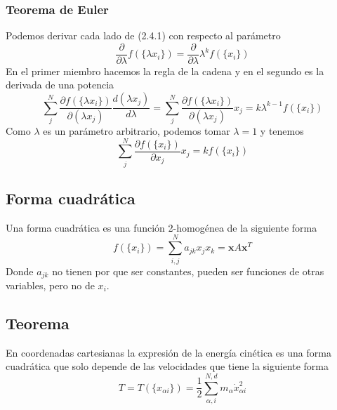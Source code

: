 \subsubsection{Teorema de Euler}
Podemos derivar cada lado de (2.4.1) con respecto al parámetro
\[\frac{\partial}{\partial \lambda} f(\{\lambda x_i\})= \frac{\partial}{\partial \lambda} \lambda^k f(\{x_i\})\]
En el primer miembro hacemos la regla de la cadena y en el segundo es la derivada de una potencia
\[\sum_j^N \frac{\partial f(\{\lambda x_i\})}{\partial (\lambda x_j)} \frac{d (\lambda x_j)}{d \lambda}= \sum_j^N \frac{\partial f(\{\lambda x_i\})}{\partial (\lambda x_j)} x_j=  k \lambda^{k-1} f(\{x_i\})\]
Como $\lambda$ es un parámetro arbitrario, podemos tomar $\lambda=1$ y tenemos
\begin{equation} \label{2.4.2}
    \sum_j^N \frac{\partial f(\{x_i\})}{\partial x_j} x_j=  k f(\{x_i\})
\end{equation} 
\subsection{Forma cuadrática}
Una forma cuadrática es una función 2-homogénea de la siguiente forma
\begin{equation} \label{2.4.3}
    f(\{x_i\})=\sum_{i,j}^N{{a_{jk} x_j x_k}}=\mathbf{x} A \mathbf{x}^T
\end{equation} 
Donde $a_{jk}$ no tienen por que ser constantes, pueden ser funciones de otras variables, pero no de $x_i$.
\subsection{Teorema}
En coordenadas cartesianas la expresión de la energía cinética es una forma cuadrática que solo depende de las velocidades que tiene la siguiente forma
\begin{equation} \label{2.4.4}
    T=T(\{x_{\alpha i}\})=\frac{1}{2} \sum_{\alpha, i}^{N,d} m_\alpha \dot{x}_{\alpha i}^2
\end{equation} 
\vspace{-25pt}

